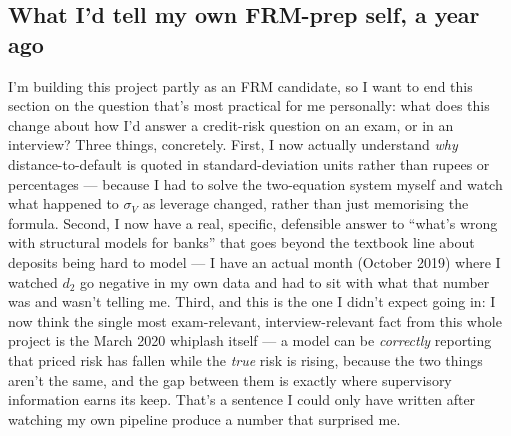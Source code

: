 \subsection{What I'd tell my own FRM-prep self, a year ago}
I'm building this project partly as an FRM candidate, so I want to end this section on the question that's most practical for me personally: what does this change about how I'd answer a credit-risk question on an exam, or in an interview? Three things, concretely. First, I now actually understand \emph{why} distance-to-default is quoted in standard-deviation units rather than rupees or percentages — because I had to solve the two-equation system myself and watch what happened to $\sigma_V$ as leverage changed, rather than just memorising the formula. Second, I now have a real, specific, defensible answer to ``what's wrong with structural models for banks'' that goes beyond the textbook line about deposits being hard to model — I have an actual month (October 2019) where I watched $d_2$ go negative in my own data and had to sit with what that number was and wasn't telling me. Third, and this is the one I didn't expect going in: I now think the single most exam-relevant, interview-relevant fact from this whole project is the March 2020 whiplash itself — a model can be \emph{correctly} reporting that priced risk has fallen while the \emph{true} risk is rising, because the two things aren't the same, and the gap between them is exactly where supervisory information earns its keep. That's a sentence I could only have written after watching my own pipeline produce a number that surprised me.
